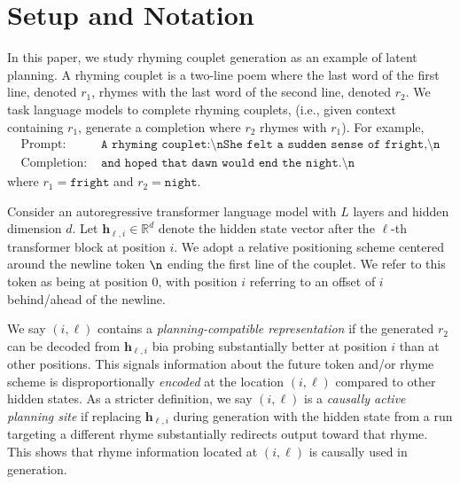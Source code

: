 \documentclass{article}
\begin{document}
\section{Setup and Notation}
\label{sec:2}
In this paper, we study rhyming couplet generation as an example of latent planning. 
A rhyming couplet is a two-line poem where the last word of the first line, denoted $r_1$, rhymes with the last word of the second line, denoted $r_2$. 
We task language models to complete rhyming couplets, (i.e., given context containing $r_1$, generate a completion where $r_2$ rhymes with $r_1$). For example, 
\begin{align*}
    \text{Prompt: }& \texttt{A rhyming couplet:\textbackslash nShe felt a sudden sense of fright,\textbackslash n} \\
    \text{Completion: }& \texttt{and hoped that dawn would end the night.\textbackslash n}
\end{align*}
where $r_1 = \texttt{fright}$ and $r_2 = \texttt{night}$.

Consider an autoregressive transformer language model with $L$ layers and hidden dimension $d$. 
Let $\mathbf{h}_{\ell,i} \in \mathbb{R}^d$ denote the hidden state vector after the $\ell$-th transformer block at position $i$. 
We adopt a relative positioning scheme centered around the newline token $\verb|\n|$ ending the first line of the couplet. 
We refer to this token as being at position 0, with position $i$ referring to an offset of $i$ behind/ahead of the newline. 


We say $(i, \ell)$ contains a \textit{planning-compatible representation} if the generated $r_2$ can be decoded from  $\mathbf{h}_{\ell,i}$ bia probing substantially better at position $i$ than at other positions. 
This signals information about the future token and/or rhyme scheme is disproportionally \emph{encoded} at the location $(i, \ell)$ compared to other hidden states.
As a stricter definition, we say $(i, \ell)$ is a \textit{causally active planning site} if replacing $\mathbf{h}_{\ell,i}$ during generation with the hidden state from a run targeting a different rhyme substantially redirects output toward that rhyme. 
This shows that rhyme information located at $(i, \ell)$ is causally used in generation. 


\end{document}
